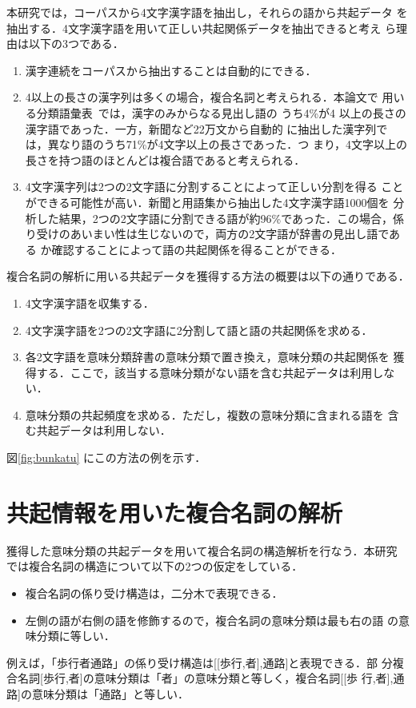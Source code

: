 本研究では，コーパスから4文字漢字語を抽出し，それらの語から共起データ
を抽出する．4文字漢字語を用いて正しい共起関係データを抽出できると考え
ら理由は以下の3つである．

\begin{enumerate}
\item 漢字連続をコーパスから抽出することは自動的にできる．
\item 4以上の長さの漢字列は多くの場合，複合名詞と考えられる．本論文で
用いる分類語彙表~\cite{hayashi:66:a}では，漢字のみからなる見出し語の
うち4\%が4 以上の長さの漢字語であった．一方，新聞など22万文から自動的
に抽出した漢字列では，異なり語のうち71\%が4文字以上の長さであった．つ
まり，4文字以上の長さを持つ語のほとんどは複合語であると考えられる．
\item 4文字漢字列は2つの2文字語に分割することによって正しい分割を得る
ことができる可能性が高い．新聞と用語集から抽出した4文字漢字語1000個を
分析した結果，2つの2文字語に分割できる語が約96\%であった．この場合，係
り受けのあいまい性は生じないので，両方の2文字語が辞書の見出し語である
か確認することによって語の共起関係を得ることができる．
\end{enumerate}

複合名詞の解析に用いる共起データを獲得する方法の概要は以下の通りである．
\begin{enumerate}
\item 4文字漢字語を収集する．
\item 4文字漢字語を2つの2文字語に2分割して語と語の共起関係を求める．
\item 各2文字語を意味分類辞書の意味分類で置き換え，意味分類の共起関係を
  獲得する．ここで，該当する意味分類がない語を含む共起データは利用しない．
\item 意味分類の共起頻度を求める．ただし，複数の意味分類に含まれる語を
含む共起データは利用しない．
\end{enumerate}

図\ref{fig:bunkatu} にこの方法の例を示す．

\section{共起情報を用いた複合名詞の解析}
\label{sec:anl}

獲得した意味分類の共起データを用いて複合名詞の構造解析を行なう．本研究
では複合名詞の構造について以下の2つの仮定をしている．
\begin{itemize}
\item 複合名詞の係り受け構造は，二分木で表現できる．
\item 左側の語が右側の語を修飾するので，複合名詞の意味分類は最も右の語
の意味分類に等しい．
\end{itemize}
例えば，「歩行者通路」の係り受け構造は[[歩行,者],通路]と表現できる．部
分複合名詞[歩行,者]の意味分類は「者」の意味分類と等しく，複合名詞[[歩
行,者],通路]の意味分類は「通路」と等しい．


